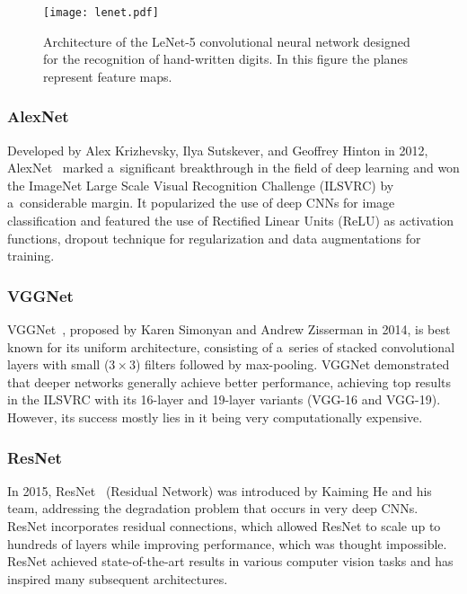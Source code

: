 \begin{figure}[t]
    \centering
    \texttt{[image: lenet.pdf]}
    \captionsetup{width=\textwidth}
    \caption{Architecture of the LeNet-5 convolutional neural network designed
    for the recognition of hand-written digits. In this figure the planes represent
    feature maps.~\cite{Lecun1998}}
    \label{LenetFig}
\end{figure}


\subsubsection{AlexNet}

Developed by Alex Krizhevsky, Ilya Sutskever, and Geoffrey Hinton in 2012,
AlexNet~\cite{NIPS2012} marked a~significant breakthrough in the field of deep
learning and won the ImageNet Large Scale Visual Recognition Challenge (ILSVRC)
by a~considerable margin. It popularized the use of deep CNNs for image
classification and featured the use of Rectified Linear Units (ReLU) as
activation functions, dropout technique for regularization and data
augmentations for training.


\subsubsection{VGGNet}

VGGNet~\cite{Simonyan2014}, proposed by Karen Simonyan and Andrew Zisserman in
2014, is best known for its uniform architecture, consisting of a~series of
stacked convolutional layers with small ($3 \times 3$) filters followed by
max-pooling.  VGGNet demonstrated that deeper networks generally achieve better
performance, achieving top results in the ILSVRC with its 16-layer and 19-layer
variants (VGG-16 and VGG-19). However, its success mostly lies in it being very
computationally expensive.


\subsubsection{ResNet}

In 2015, ResNet~\cite{He2015} (Residual Network) was introduced by Kaiming He
and his team, addressing the degradation problem that occurs in very deep CNNs.
ResNet incorporates residual connections, which allowed ResNet to scale up to
hundreds of layers while improving performance, which was thought impossible.
ResNet achieved state-of-the-art results in various computer vision tasks and
has inspired many subsequent architectures.


